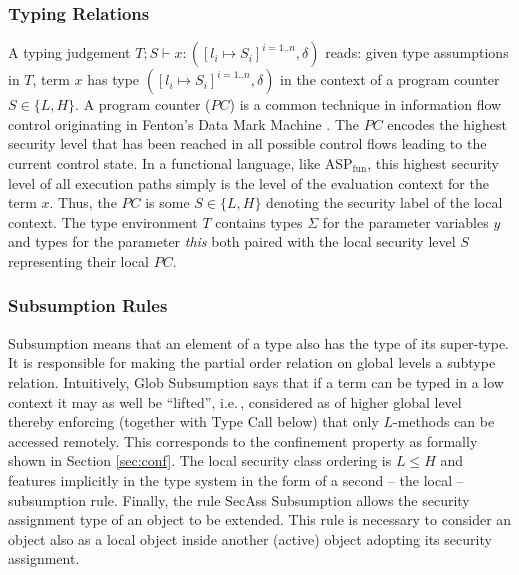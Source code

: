 \documentclass[10pt, conference, compsocconf]{IEEEtran}
\newcommand\aspfunp{ASP${}_\text{fun}$}
\newcommand\ie{i.e.\!\,, }
\begin{document}
{\subsubsection*{Typing Relations}
A typing judgement $T; S \vdash x: ([l_i \mapsto S_i]^{i=1..n}, \delta)$ reads: 
given type assumptions in $T$, term $x$ has type $([l_i \mapsto S_i]^{i=1..n}, \delta)$
in the context of a program counter $S \in \{L, H\}$. 
A program counter ($PC$) is a common technique in information flow control 
originating in Fenton's Data Mark Machine \cite{fen:73}. The $PC$ encodes the highest security level that has been reached in all possible control flows leading 
to the current control state. In a functional language, like \aspfunp, this highest security level of all execution paths simply is the level of the evaluation context 
for the term $x$.
Thus, the $PC$ is some $S \in \{L,H\}$ denoting the security label of the local context. 
The type environment $T$ contains types $\Sigma$ for the parameter variables
$y$ and types for the parameter {\it this} both paired with the local security 
level $S$ representing their local $PC$.


\subsubsection*{Subsumption Rules}
Subsumption means that an element of a type also has the type of its super-type. 
It is responsible for making the partial order relation on global levels a subtype relation. 
Intuitively, {\sc Glob Subsumption} says that if a term can be typed in a low context
it may as well be ``lifted'', \ie considered as of higher global level thereby enforcing 
(together with {\sc Type Call} below) that only $L$-methods can be accessed remotely.
This corresponds to the confinement property as formally shown in Section \ref{sec:conf}.
The local security class ordering is $L \leq H$ and features implicitly in the type 
system in the form of a second -- the local -- subsumption rule.
Finally, the rule {\sc SecAss Subsumption} allows the security assignment type of an object
to be extended. This rule is necessary to consider an object also as a local object
inside another (active) object adopting its security assignment.
\begin{table}[!h]
\vspace{-3ex}
\begin{mathpar}



\end{mathpar}
\end{table}}
\end{document}

